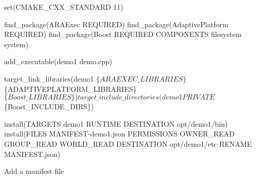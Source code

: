 \begin{DoxyItemize}
\begin{DoxyCode}
set(CMAKE\_CXX\_STANDARD 11)

find\_package(ARAExec REQUIRED)
find\_package(AdaptivePlatform REQUIRED)
find\_package(Boost REQUIRED COMPONENTS filesystem system)

add\_executable(demo1 demo.cpp)

target\_link\_libraries(demo1 $\{ARAEXEC\_LIBRARIES\} $\{ADAPTIVEPLATFORM\_LIBRARIES\} $\{Boost\_LIBRARIES\})
target\_include\_directories(demo1  PRIVATE $\{Boost\_INCLUDE\_DIRS\})

install(TARGETS demo1 RUNTIME DESTINATION opt/demo1/bin)
install(FILES MANIFEST-demo1.json PERMISSIONS OWNER\_READ GROUP\_READ WORLD\_READ DESTINATION opt/demo1/etc
       RENAME MANIFEST.json)
\end{DoxyCode}

\item Add a manifest file 
 

\end{DoxyItemize}
